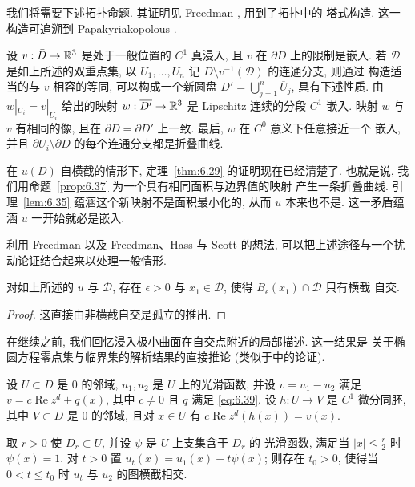 我们将需要下述拓扑命题. 其证明见 Freedman \cite{Fr}, 用到了拓扑中的
塔式构造. 这一构造可追溯到 Papakyriakopolous \cite{Pa}.

\begin{proposition}
\label{prop:6.37}
设 $v:\bar{D}\to\mathbb{R}^3$ 是处于一般位置的 $C^1$ 真浸入, 且 $v$ 在
$\partial D$ 上的限制是嵌入. 若 $\mathcal{D}$ 是如上所述的双重点集, 以
$U_1,\ldots,U_n$ 记 $D\setminus v^{-1}(\mathcal{D})$ 的连通分支, 则通过
构造适当的与 $v$ 相容的等同, 可以构成一个新圆盘
$D'=\bigcup_{j=1}^{n}\overline{U}_j$, 具有下述性质. 由
$w|_{U_i}=v|_{U_i}$ 给出的映射 $w:\overline{D'}\to\mathbb{R}^3$ 是 Lipschitz
连续的分段 $C^1$ 嵌入. 映射 $w$ 与 $v$ 有相同的像, 且在
$\partial D=\partial D'$ 上一致. 最后, $w$ 在 $C^0$ 意义下任意接近一个
嵌入, 并且 $\partial U_i\setminus\partial D$ 的每个连通分支都是折叠曲线.
\end{proposition}

在 $u(D)$ 自横截的情形下, 定理~\ref{thm:6.29} 的证明现在已经清楚了.
也就是说, 我们用命题~\ref{prop:6.37} 为一个具有相同面积与边界值的映射
产生一条折叠曲线. 引理~\ref{lem:6.35} 蕴涵这个新映射不是面积最小化的,
从而 $u$ 本来也不是. 这一矛盾蕴涵 $u$ 一开始就必是嵌入.

利用 Freedman \cite{Fr} 以及 Freedman、Hass 与 Scott \cite{FHS} 的想法,
可以把上述途径与一个扰动论证结合起来以处理一般情形.

\begin{lemma}
\label{lem:6.38}
对如上所述的 $u$ 与 $\mathcal{D}$, 存在 $\epsilon>0$ 与
$x_1\in\mathcal{D}$, 使得 $B_\epsilon(x_1)\cap\mathcal{D}$ 只有横截
自交.
\end{lemma}

\begin{proof}
这直接由非横截自交是孤立的推出.
\end{proof}

在继续之前, 我们回忆浸入极小曲面在自交点附近的局部描述. 这一结果是
关于椭圆方程零点集与临界集的解析结果的直接推论 (类似于中的论证).

\begin{lemma}
\label{lem:6.39}
设 $U\subset D$ 是 $0$ 的邻域, $u_1,u_2$ 是 $U$ 上的光滑函数, 并设
$v=u_1-u_2$ 满足 $v=c\operatorname{Re}z^d+q(x)$, 其中 $c\neq0$ 且 $q$
满足 \eqref{eq:6.39}. 设 $h:U\to V$ 是 $C^1$ 微分同胚, 其中
$V\subset D$ 是 $0$ 的邻域, 且对 $x\in U$ 有
$c\operatorname{Re}z^d(h(x))=v(x)$.

取 $r>0$ 使 $D_r\subset U$, 并设 $\psi$ 是 $U$ 上支集含于 $D_r$ 的
光滑函数, 满足当 $|x|\leq\frac{r}{2}$ 时 $\psi(x)=1$. 对 $t>0$ 置
$u_t(x)=u_1(x)+t\psi(x)$; 则存在 $t_0>0$, 使得当 $0<t\leq t_0$ 时
$u_t$ 与 $u_2$ 的图横截相交.
\end{lemma}

